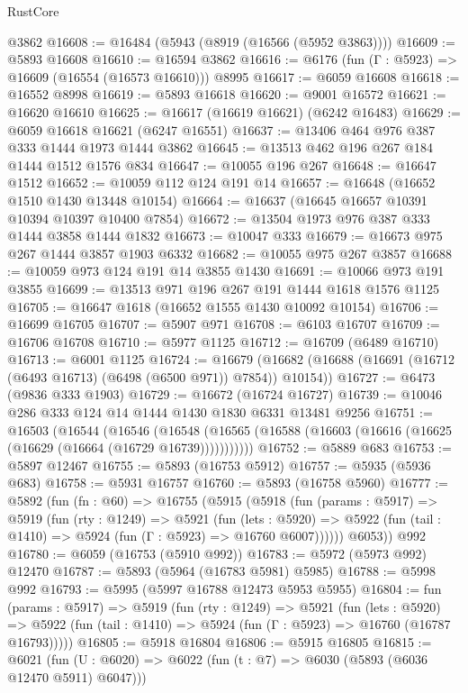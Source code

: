 \begin{lexlean}{RustCore}
\begin{coremodule}
    @3862
@16608 := @16484 (@5943 (@8919 (@16566 (@5952 @3863))))
@16609 := @5893 @16608
@16610 := @16594 @3862
@16616 := @6176 (fun (Γ : @5923) => @16609 (@16554 (@16573 @16610))) @8995
@16617 := @6059 @16608
@16618 := @16552 @8998
@16619 := @5893 @16618
@16620 := @9001 @16572
@16621 := @16620 @16610
@16625 := @16617 (@16619 @16621) (@6242 @16483)
@16629 := @6059 @16618 @16621 (@6247 @16551)
@16637 := @13406 @464 @976 @387 @333 @1444 @1973 @1444 @3862
@16645 := @13513 @462 @196 @267 @184 @1444 @1512 @1576 @834
@16647 := @10055 @196 @267
@16648 := @16647 @1512
@16652 := @10059 @112 @124 @191 @14
@16657 := @16648 (@16652 @1510 @1430 @13448 @10154)
@16664 := @16637 (@16645 @16657 @10391 @10394 @10397 @10400 @7854)
@16672 := @13504 @1973 @976 @387 @333 @1444 @3858 @1444 @1832
@16673 := @10047 @333
@16679 := @16673 @975 @267 @1444 @3857 @1903 @6332
@16682 := @10055 @975 @267 @3857
@16688 := @10059 @973 @124 @191 @14 @3855 @1430
@16691 := @10066 @973 @191 @3855
@16699 := @13513 @971 @196 @267 @191 @1444 @1618 @1576 @1125
@16705 := @16647 @1618 (@16652 @1555 @1430 @10092 @10154)
@16706 := @16699 @16705
@16707 := @5907 @971
@16708 := @6103 @16707
@16709 := @16706 @16708
@16710 := @5977 @1125
@16712 := @16709 (@6489 @16710)
@16713 := @6001 @1125
@16724 := @16679
    (@16682 (@16688 (@16691 (@16712 (@6493 @16713) (@6498 (@6500 @971)) @7854)) @10154))
@16727 := @6473 (@9836 @333 @1903)
@16729 := @16672 (@16724 @16727)
@16739 := @10046 @286 @333 @124 @14 @1444 @1430 @1830 @6331 @13481 @9256
@16751 := @16503
    (@16544
      (@16546
        (@16548 (@16565 (@16588 (@16603 (@16616 (@16625 (@16629 (@16664 (@16729 @16739)))))))))))
@16752 := @5889 @683
@16753 := @5897 @12467
@16755 := @5893 (@16753 @5912)
@16757 := @5935 (@5936 @683)
@16758 := @5931 @16757
@16760 := @5893 (@16758 @5960)
@16777 := @5892
    (fun (fn : @60) =>
    @16755
      (@5915
        (@5918
          (fun (params : @5917) =>
          @5919
            (fun (rty : @1249) =>
            @5921
              (fun (lets : @5920) =>
              @5922 (fun (tail : @1410) => @5924 (fun (Γ : @5923) => @16760 @6007))))))
        @6053))
    @992
@16780 := @6059 (@16753 (@5910 @992))
@16783 := @5972 (@5973 @992) @12470
@16787 := @5893 (@5964 (@16783 @5981) @5985)
@16788 := @5998 @992
@16793 := @5995 (@5997 @16788 @12473 @5953 @5955)
@16804 := fun (params : @5917) =>
  @5919
    (fun (rty : @1249) =>
    @5921
      (fun (lets : @5920) =>
      @5922 (fun (tail : @1410) => @5924 (fun (Γ : @5923) => @16760 (@16787 @16793)))))
@16805 := @5918 @16804
@16806 := @5915 @16805
@16815 := @6021
    (fun (U : @6020) => @6022 (fun (t : @7) => @6030 (@5893 (@6036 @12470 @5911) @6047)))

\end{coremodule}
\end{lexlean}

